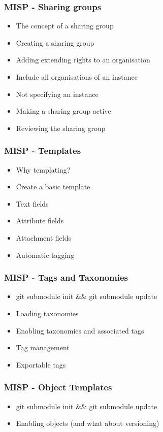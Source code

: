\begin{frame}
    \frametitle{MISP - Sharing groups}
        \begin{itemize}
            \item The concept of a sharing group
            \item Creating a sharing group
            \item Adding extending rights to an organisation
            \item Include all organisations of an instance
            \item Not specifying an instance
            \item Making a sharing group active
            \item Reviewing the sharing group
        \end{itemize}
\end{frame}

\begin{frame}
    \frametitle{MISP - Templates}
        \begin{itemize}
            \item Why templating?
            \item Create a basic template
            \item Text fields
            \item Attribute fields
            \item Attachment fields
            \item Automatic tagging
        \end{itemize}
\end{frame}

\begin{frame}
    \frametitle{MISP - Tags and Taxonomies}
        \begin{itemize}
            \item git submodule init \&\& git submodule update
            \item Loading taxonomies
            \item Enabling taxonomies and associated tags
            \item Tag management
            \item Exportable tags
        \end{itemize}
\end{frame}

\begin{frame}
    \frametitle{MISP - Object Templates}
        \begin{itemize}
            \item git submodule init \&\& git submodule update
            \item Enabling objects (and what about versioning)
        \end{itemize}
\end{frame}


